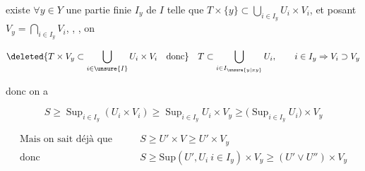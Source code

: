 existe $\forall y\in Y$ une partie finie $I_y$ de $I$ telle que $T\times\{y\}\subset\bigcup_{i\in I_y}U_i\times V_i$, et posant $V_y=\bigcap_{i\in I_y}V_i$, , , on

\[
\deleted{T\times V_y\subset\bigcup_{i\in\unsure{I}}U_i\times V_i\quad\text{donc}}\quad
 T\subset\bigcup_{i\in I_{\unsure{y|xy}}}U_i,\qquad i\in I_y\Rightarrow V_i\supset V_y
\]

donc on a

\[
S\geq\mathop{\mathrm{Sup}}_{i\in I_y}(U_i\times V_i)\geq\mathop{\mathrm{Sup}}_{i\in I_y}U_i\times V_y\geq\bigl(\mathop{\mathrm{Sup}}_{i\in I_y}U_i\bigr)\times V_y
\]

\[
\begin{aligned}
\text{Mais on sait déjà que}\qquad &S\geq U'\times V\geq U'\times V_y\\
\text{donc}\qquad &S\geq\mathrm{Sup}(U',U_i\ i\in I_y)\times V_y\geq(U'\vee U'')\times V_y
\end{aligned}
\]

